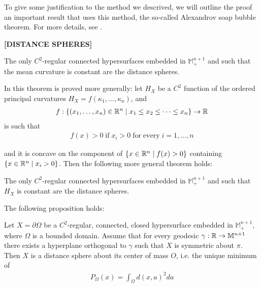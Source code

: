 To give some justification to the method we descrived, we will outline the proof an important result that uses this method, the so-called Alexandrov soap bubble theorem. For more details, see \cite{italiani}. 
\begin{defin}
	{\vspace{10pt}\LARGE \bf [DISTANCE SPHERES]}
\end{defin}
\begin{theorem}
	The only $C^2$-regular connected hypersurfaces embedded in $\mathbb{M}^{n+1}_+$ and such that the mean curvature is constant are the distance spheres.\label{Alexandrov theorem} 
\end{theorem}
In \cite{italiani} this theorem is proved more generally: let $H_X$ be a $C^2$ function of the ordered principal curvatures $H_X=f(\kappa_1, \dots, \kappa_n)$, and
\begin{align*}
	f:\{(x_1, \dots, x_n)\in \mathbb{R}^n \;|\;x_1\leq x_2\leq \dots \leq x_n \}\rightarrow \mathbb{R}
\end{align*}
is such that
\begin{align*}
	f(x)>0 \;\mathrm{if \;} x_i>0 \; \mathrm{for \; every \;} i=1, \dots, n
\end{align*}

and it is concave on the component of $\{x\in \mathbb{R}^n \;|\; f(x)>0\}$ containing $\{x\in \mathbb{R}^n \;|\;  x_i>0 \}$. Then the following more general theorem holds: 

\begin{theorem}
	The only $C^2$-regular connected hypersurfaces embedded in $\mathbb{M}^{n+1}_+$ and such that $H_X$ is constant are the distance spheres. 
\end{theorem}

The following proposition holds:

\begin{proposition}
	Let $X=\partial\Omega$ be a $C^2$-regular, connected, closed hypersurface embedded in $\mathbb{M}^{n+1}_+$, where $\Omega$ is a bounded domain. Assume that for every geodesic $\gamma:\mathbb{R}\rightarrow \mathbb{M}^{n+1}$ there exists a hyperplane orthogonal to $\gamma$ such that $X$ is symmetric about $\pi$. Then $X$ is a distance sphere about its center of mass $O$, i.e. the unique minimum of 
	\begin{align*}
		P_\Omega(x)=\int_\Omega d(x, a)^2 da
	\end{align*}
\end{proposition}

